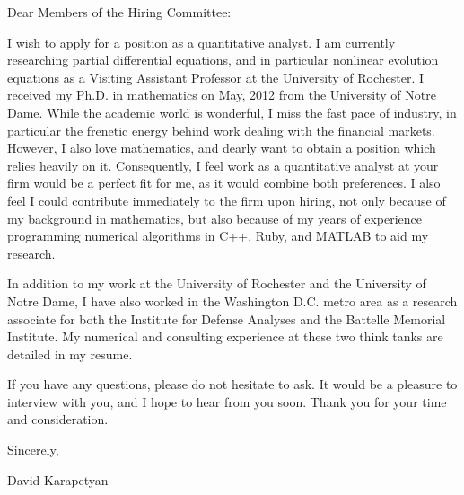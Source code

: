 Dear Members of the Hiring Committee:

I wish to apply for a position as a quantitative analyst. I am currently
researching partial differential equations, and in particular nonlinear
evolution equations as a Visiting Assistant Professor at the University of
Rochester. I received my Ph.D. in mathematics on May, 2012 from the University
of Notre Dame. While the academic world is wonderful, I miss the fast pace of
industry, in particular the frenetic energy behind work dealing with the
financial markets. However, I also love mathematics, and dearly want to obtain
a position which relies heavily on it. Consequently, I feel work as a
quantitative analyst at your firm would be a perfect fit for me, as it would
combine both preferences. I also feel I could contribute immediately to the
firm upon hiring, not only because of my background in mathematics, but also
because of my years of experience programming numerical algorithms in C++,
Ruby, and MATLAB to aid my research. 

In addition to my work at the University of Rochester and the University of
Notre Dame, I have also worked in the Washington D.C. metro area as a research
associate for both the Institute for Defense Analyses and the Battelle Memorial
Institute. My numerical and consulting experience at these two think tanks are
detailed in my resume. 

If you have any questions, please do not hesitate to ask. It would be a
pleasure to interview with you, and I hope to hear from you soon. Thank you for
your time and consideration. 

Sincerely,

David Karapetyan
